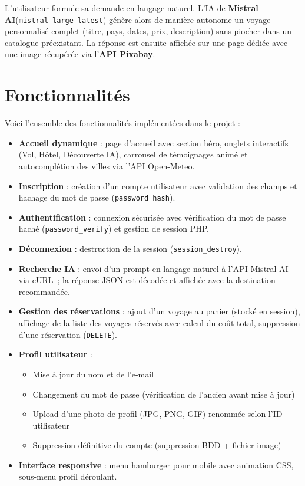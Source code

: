 \documentclass[a4paper,12pt]{article}
\begin{document}
L'utilisateur formule sa demande en langage naturel. L'IA de \textbf{Mistral AI}(\texttt{mistral-large-latest}) génère alors de manière autonome un voyage personnalisé complet (titre, pays, dates, prix, description) sans piocher dans un catalogue préexistant. La réponse est ensuite affichée sur une page dédiée avec une image récupérée via l'\textbf{API Pixabay}.

\section{Fonctionnalités}

Voici l'ensemble des fonctionnalités implémentées dans le projet :

\begin{itemize}
  \item \textbf{Accueil dynamique} : page d'accueil avec section héro, onglets interactifs (Vol, Hôtel, Découverte IA), carrousel de témoignages animé et autocomplétion des villes via l'API Open-Meteo.
  \item \textbf{Inscription} : création d'un compte utilisateur avec validation des champs et hachage du mot de passe (\texttt{password\_hash}).
  \item \textbf{Authentification} : connexion sécurisée avec vérification du mot de passe haché (\texttt{password\_verify}) et gestion de session PHP.
  \item \textbf{Déconnexion} : destruction de la session (\texttt{session\_destroy}).
  \item \textbf{Recherche IA} : envoi d'un prompt en langage naturel à l'API Mistral AI via cURL~; la réponse JSON est décodée et affichée avec la destination recommandée.
  \item \textbf{Gestion des réservations} : ajout d'un voyage au panier (stocké en session), affichage de la liste des voyages réservés avec calcul du coût total, suppression d'une réservation (\texttt{DELETE}).
  \item \textbf{Profil utilisateur} :
    \begin{itemize}
      \item Mise à jour du nom et de l'e-mail
      \item Changement du mot de passe (vérification de l'ancien avant mise à jour)
      \item Upload d'une photo de profil (JPG, PNG, GIF) renommée selon l'ID utilisateur
      \item Suppression définitive du compte (suppression BDD + fichier image)
    \end{itemize}
  \item \textbf{Interface responsive} : menu hamburger pour mobile avec animation CSS, sous-menu profil déroulant.
\end{itemize}
\end{document}
